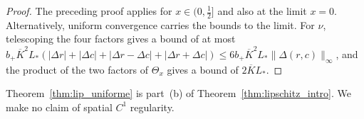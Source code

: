 \begin{proof} The preceding proof applies for $x\in(0,\frac12]$ and also at the limit $x=0$. Alternatively, uniform convergence carries
the bounds to the limit. For $\nu$, telescoping the four factors gives a bound of at most $b_+\overline K^2L_*(|\Delta r|+|\Delta
c|+|\Delta r-\Delta c|+|\Delta r+\Delta c|)\le6b_+\overline K^2L_*\|\Delta(r,c)\|_\infty$, and the product of the two factors of
$\Theta_x$ gives a bound of $2\overline KL_*$. \end{proof}

Theorem~\ref{thm:lip_uniforme} is part~(b) of Theorem~\ref{thm:lipschitz_intro}. We make no claim of spatial $C^1$ regularity.
